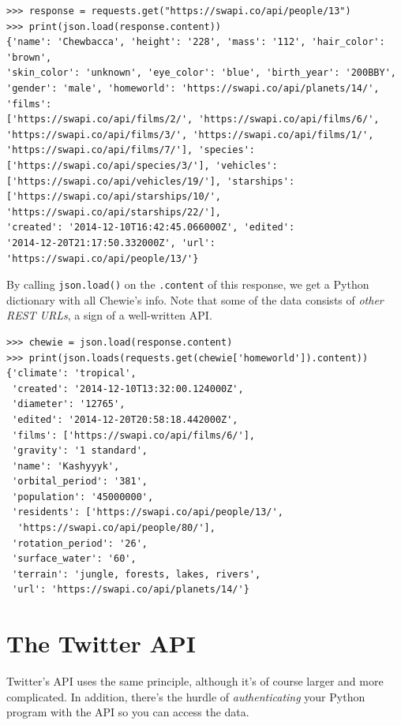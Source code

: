 \documentclass[12pt]{article}
\begin{document}
\small
\begin{Verbatim}[fontsize=\small,samepage=true,frame=none]
>>> response = requests.get("https://swapi.co/api/people/13")
>>> print(json.load(response.content))
{'name': 'Chewbacca', 'height': '228', 'mass': '112', 'hair_color': 'brown',
'skin_color': 'unknown', 'eye_color': 'blue', 'birth_year': '200BBY',
'gender': 'male', 'homeworld': 'https://swapi.co/api/planets/14/', 'films':
['https://swapi.co/api/films/2/', 'https://swapi.co/api/films/6/',
'https://swapi.co/api/films/3/', 'https://swapi.co/api/films/1/',
'https://swapi.co/api/films/7/'], 'species':
['https://swapi.co/api/species/3/'], 'vehicles':
['https://swapi.co/api/vehicles/19/'], 'starships':
['https://swapi.co/api/starships/10/', 'https://swapi.co/api/starships/22/'],
'created': '2014-12-10T16:42:45.066000Z', 'edited':
'2014-12-20T21:17:50.332000Z', 'url': 'https://swapi.co/api/people/13/'}
\end{Verbatim}
\normalsize

By calling \texttt{json.load()} on the \texttt{.content} of this response, we
get a Python dictionary with all Chewie's info. Note that some of the data
consists of \textit{other REST URLs}, a sign of a well-written API.

\small
\begin{Verbatim}[fontsize=\small,samepage=true,frame=none]
>>> chewie = json.load(response.content)
>>> print(json.loads(requests.get(chewie['homeworld']).content))
{'climate': 'tropical',
 'created': '2014-12-10T13:32:00.124000Z',
 'diameter': '12765',
 'edited': '2014-12-20T20:58:18.442000Z',
 'films': ['https://swapi.co/api/films/6/'],
 'gravity': '1 standard',
 'name': 'Kashyyyk',
 'orbital_period': '381',
 'population': '45000000',
 'residents': ['https://swapi.co/api/people/13/',
  'https://swapi.co/api/people/80/'],
 'rotation_period': '26',
 'surface_water': '60',
 'terrain': 'jungle, forests, lakes, rivers',
 'url': 'https://swapi.co/api/planets/14/'}
\end{Verbatim}
\normalsize



\section{The Twitter API}

Twitter's API uses the same principle, although it's of course larger and more
complicated. In addition, there's the hurdle of \textit{authenticating} your
Python program with the API so you can access the data.
\end{document}
